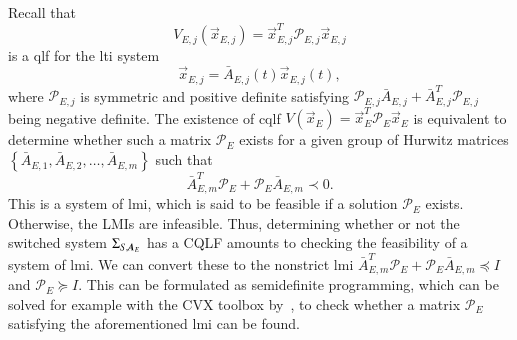 Recall that 
\begin{equation}
	V_{E,j}(\vec{x}_{E,j})=\vec{x}_{E,j}^{T}\mathcal{P}_{E,j}\vec{x}_{E,j}
\end{equation} is a \ac{qlf} for the \ac{lti} system 
\begin{equation}
	\vec{x}_{E,j}=\bar{A}_{E,j}(t)\vec{x}_{E,j}(t),
\end{equation} where $\mathcal{P}_{E,j}$ is symmetric and positive definite satisfying $\mathcal{P}_{E,j}\bar{A}_{E,j}
+\bar{A}_{E,j}^{T}\mathcal{P}_{E,j}$ being negative definite. The existence of \ac{cqlf} $V(\vec{x}_{E})=\vec{x}_{E}^{T}\mathcal{P}_{E}\vec{x}_{E}$ is equivalent to determine whether such a matrix $\mathcal{P}_{E}$ exists for a given group of Hurwitz matrices $\left\lbrace \bar{A}_{E,1}, \bar{A}_{E,2}, \ldots,\bar{A}_{E,m}\right\rbrace$ such that 
\begin{equation}
	\bar{A}_{E,m}^{T}\mathcal{P}_{E}
+\mathcal{P}_{E}\bar{A}_{E,m}  \prec 0.
\end{equation}
This is a system of \ac{lmi}, which is said to be feasible if a solution $\mathcal{P}_{E}$ exists. Otherwise, the LMIs are infeasible. 
Thus, determining whether or not the switched system $\Sigma_{S,\bar{\emph{\textbf{A}}}_{E}}$ has a CQLF amounts to checking the feasibility of a system of \ac{lmi}. 
We can convert these to the nonstrict \ac{lmi} 
$
\bar{A}_{E,m}^{T}\mathcal{P}_{E}
+\mathcal{P}_{E}\bar{A}_{E,m}  \preceq I
$ and 
$
\mathcal{P}_{E} \succeq I
$.
This can be formulated as semidefinite programming, which can be solved for example with the CVX toolbox by~\cite{c12,c13}, to check whether a matrix $\mathcal{P}_{E}$ satisfying the aforementioned \ac{lmi} can be found. 
